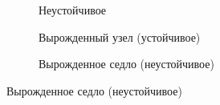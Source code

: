 \begin{figure}[H]
  \centering

  \begin{subfigure}[b]{0.3\textwidth}
    
    \caption{Неустойчивое}

  \end{subfigure}
  \qquad
  \begin{subfigure}[b]{0.3\textwidth}

    
    \caption{Вырожденный узел (устойчивое)}

  \end{subfigure}
  \qquad
  \begin{subfigure}[b]{0.3\textwidth}

    
    \caption{Вырожденное седло (неустойчивое)}

  \end{subfigure}
\end{figure}
